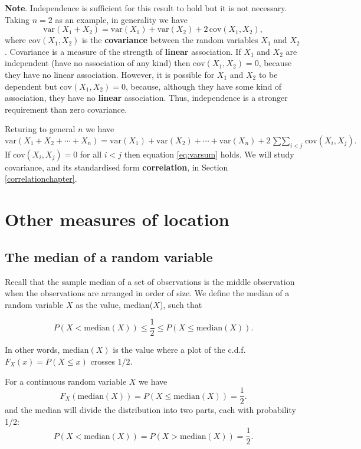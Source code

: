 \documentclass[
  british,
]{book}
\begin{document}
\textbf{Note}. Independence is sufficient for this result to hold but it is not necessary. Taking \(n=2\) as an example, in generality we have
\[ \mathrm{var}(X_1 + X_2) = \mathrm{var}(X_1) + \mathrm{var}(X_2) + 2\,\mathrm{cov}(X_1,X_2), \]
where \(\mathrm{cov}(X_1,X_2)\) is the \textbf{covariance} between the random variables \(X_1\) and \(X_2\). Covariance is a measure of the strength of \textbf{linear} association. If \(X_1\) and \(X_2\) are independent (have no association of any kind) then \(\mathrm{cov}(X_1,X_2)=0\), because they have no linear association. However, it is possible for \(X_1\) and \(X_2\) to be dependent but \(\mathrm{cov}(X_1,X_2)=0\), because, although they have some kind of association, they have no \textbf{linear} association. Thus, independence is a stronger requirement than zero covariance.

Returing to general \(n\) we have
\[ \mathrm{var}(X_1 + X_2 + \cdots + X_n) = \mathrm{var}(X_1) + \mathrm{var}(X_2) + \cdots + \mathrm{var}(X_n) + 2 \mathop{\sum\sum}_{i < j} \mathrm{cov}(X_i,X_j). \]
If \(\mathrm{cov}(X_i,X_j)=0\) for all \(i < j\) then equation \eqref{eq:varsum} holds. We will study covariance, and its standardised form \textbf{correlation}, in Section \ref{correlationchapter}.

\hypertarget{locations}{%
\section{Other measures of location}\label{locations}}

\hypertarget{the-median-of-a-random-variable}{%
\subsection{The median of a random variable}\label{the-median-of-a-random-variable}}

Recall that the sample median of a set of observations is the middle observation when the observations are arranged in order of size. We define the median of a random variable \(X\) as the value, median(\(X\)), such that

\[ P(X < \mathrm{median}(X)) \leq \frac12 \leq P(X \leq \mathrm{median}(X)). \]

In other words, \(\mathrm{median}(X)\) is the value where a plot of the c.d.f. \(F_X(x)=P(X \leq x)\) crosses \(1/2\).

For a continuous random variable \(X\) we have
\[  F_X(\mathrm{median}(X)) = P(X \leq \mathrm{median}(X)) =\frac12. \]
and the median will divide the distribution into two parts, each with probability 1/2:
\[ P(X < \mathrm{median}(X)) = P(X > \mathrm{median}(X)) = \frac12. \]
\end{document}
